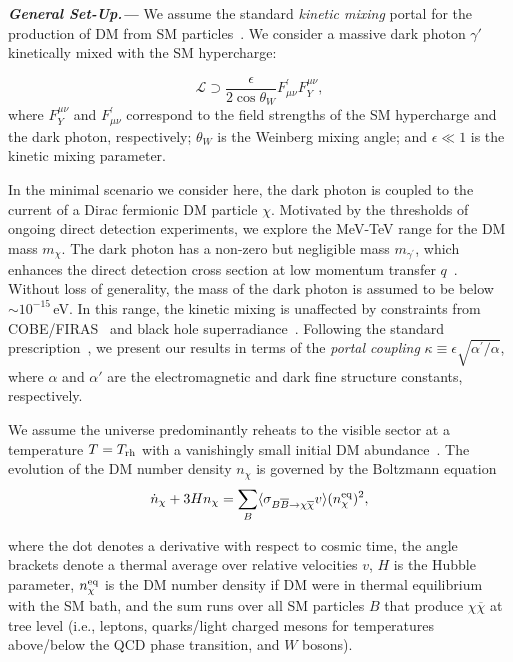 \documentclass[notitlepage,nofootinbib,preprintnumbers,aps,superscriptaddress,twocolumn]{revtex4-1}
\begin{document}

\textbf{\textit{General Set-Up.---}} We assume the standard \textit{kinetic mixing} portal for the production of DM from SM particles~\cite{GALISON1984279,Holdom:1985ag,Ackerman:2008kmp,Feng:2008mu,Feng:2009mn}. We consider a massive dark photon $\gamma'$ kinetically mixed with the SM hypercharge:

\begin{equation}
    \mathcal{L}\supset
    \frac{\epsilon}{2 \cos\theta_W}F^\prime_{\mu\nu}F_Y^{\mu\nu},
\end{equation}
where $F_Y^{\mu\nu}$ and $F^\prime_{\mu\nu}$ correspond to the field strengths of the SM hypercharge and the dark photon, respectively; $\theta_W$ is the Weinberg mixing angle; and $\epsilon\ll 1$ is the kinetic mixing parameter.

In the minimal scenario we consider here, the dark photon is coupled to the current of a Dirac fermionic DM particle $\chi$. Motivated by the thresholds of ongoing direct detection experiments, we explore the MeV-TeV range for the DM mass $m_\chi$. The dark photon has a non-zero but negligible mass $m_{\gamma^\prime}$, which enhances the direct detection cross section at low momentum transfer $q$~\cite{Essig:2011nj}. Without loss of generality, the mass of the dark photon is assumed to be below $\sim 10^{-15}\,$eV. In this range, the kinetic mixing is unaffected by constraints from COBE/FIRAS~\cite{Fixsen:1996nj,Caputo:2020bdy} and black hole superradiance~\cite{Baryakhtar:2017ngi,Siemonsen:2022ivj}.
Following the standard prescription~\cite{Chu:2011be}, we present our results in terms of the \textit{portal coupling} $\kappa\equiv \epsilon \sqrt{\alpha^\prime/\alpha}$, where $\alpha$ and $\alpha'$ are the electromagnetic and dark fine structure constants, respectively.

We assume the universe predominantly reheats to the visible sector at a temperature $T=T_{\rm{rh}}$ with a vanishingly small initial DM abundance~\cite{Hall:2009bx}. The evolution of the DM number density $n_\chi$ is governed by the Boltzmann equation
\begin{equation}
    \dot{n}_\chi+3H n_\chi=\sum_{B} \langle \sigma_{B\overline{B} \rightarrow \chi\overline{\chi}} v \rangle (n^{\rm eq}_\chi)^2, \label{eq:nchi}
\end{equation}

where the dot denotes a derivative with respect to cosmic time, the angle brackets denote a thermal average over relative velocities $v$, $H$ is the Hubble parameter, $n^{\rm eq}_\chi$ is the DM number density if DM were in thermal equilibrium with the SM bath, and the sum runs over all SM particles $B$ that produce $\chi \overline{\chi}$ at tree level (i.e., leptons, quarks/light charged mesons for temperatures above/below the QCD phase transition, and $W$ bosons).
\end{document}
